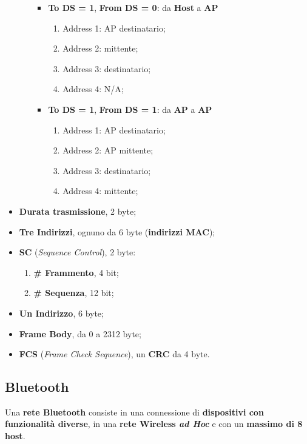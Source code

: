 \documentclass[a4paper]{article}
\begin{document}
\begin{itemize}
\begin{itemize}
\begin{itemize}
							\item \textbf{To DS = 1}, \textbf{From DS = 0}: da \textbf{Host} a \textbf{AP}
							\begin{enumerate}
								\item Address 1: AP destinatario;
								\item Address 2: mittente;
								\item Address 3: destinatario;
								\item Address 4: N/A;
							\end{enumerate}			
							\item \textbf{To DS = 1}, \textbf{From DS = 1}: da \textbf{AP} a \textbf{AP}
							\begin{enumerate}
								\item Address 1: AP destinatario;
								\item Address 2: AP mittente;
								\item Address 3: destinatario;
								\item Address 4: mittente;
							\end{enumerate}			
						\end{itemize}
					\end{itemize}
					\item \textbf{Durata trasmissione}, 2 byte;
					\item \textbf{Tre Indirizzi}, ognuno da 6 byte (\textbf{indirizzi MAC});
					\newpage
					\item \textbf{SC} (\emph{Sequence Control}), 2 byte:
					\begin{enumerate}
						\item \textbf{\# Frammento}, 4 bit;
						\item \textbf{\# Sequenza}, 12 bit;
					\end{enumerate}
					\item \textbf{Un Indirizzo}, 6 byte;
					\item \textbf{Frame Body}, da 0 a 2312 byte;
					\item \textbf{FCS} (\emph{Frame Check Sequence}), un \textbf{CRC} da 4 byte.
				\end{itemize}
					
	
	\subsection{Bluetooth}
		
		Una \textbf{rete Bluetooth} consiste in una connessione di \textbf{dispositivi con funzionalità diverse}, in una \textbf{rete Wireless \emph{ad Hoc}} e con un \textbf{massimo di 8 host}.
		
\end{document}
